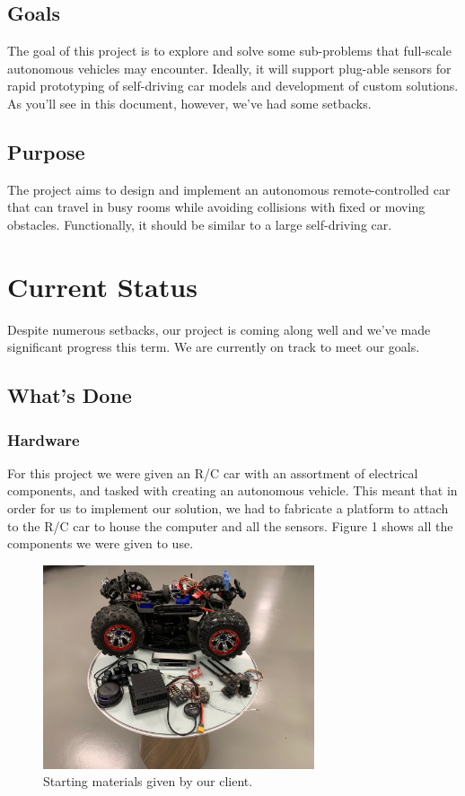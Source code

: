 \documentclass[onecolumn, draftclsnofoot, 10pt, compsoc]{IEEEtran}
\begin{document}
\subsection{Goals}
The goal of this project is to explore and solve some sub-problems that full-scale autonomous vehicles may encounter. Ideally, it will support plug-able sensors for rapid prototyping of self-driving car models and development of custom solutions. As you'll see in this document, however, we've had some setbacks.

\subsection{Purpose}

The project aims to design and implement an autonomous remote-controlled car that can travel in busy rooms while avoiding collisions with fixed or moving obstacles. Functionally, it should be similar to a large self-driving car.

\section{Current Status}
Despite numerous setbacks, our project is coming along well and we've made significant progress this term. We are currently on track to meet our goals.

\subsection{What's Done}

\subsubsection{Hardware}

For this project we were given an R/C car with an assortment of electrical components, and tasked with creating an autonomous vehicle. This meant that in order for us to implement our solution, we had to fabricate a platform to attach to the R/C car to house the computer and all the sensors. Figure 1 shows all the components we were given to use. 
\begin{figure}[htp]
    \centering
    \includegraphics[width=8cm]{given.jpeg}
    \caption{Starting materials given by our client.}
\end{figure}
\end{document}
